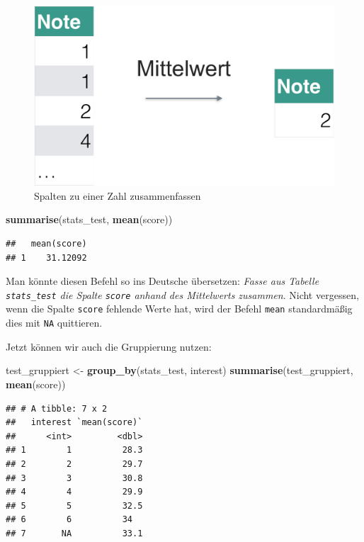 \documentclass[12pt,ngerman,paper=a4,pagesize,DIV=13]{scrreprt}
\newenvironment{Shaded}{\begin{snugshade}}{\end{snugshade}}
\newcommand{\KeywordTok}[1]{\textcolor[rgb]{0.13,0.29,0.53}{\textbf{#1}}}
\newcommand{\NormalTok}[1]{#1}
\newcommand{\StringTok}[1]{\textcolor[rgb]{0.31,0.60,0.02}{#1}}
\begin{document}
\begin{figure}

{\centering \includegraphics[width=0.6\linewidth]{Inhalte/images/Datenjudo/summarise} 

}

\caption{Spalten zu einer Zahl zusammenfassen}\label{fig:fig-summarise}
\end{figure}

\begin{Shaded}
\begin{Highlighting}[]
\KeywordTok{summarise}\NormalTok{(stats_test, }\KeywordTok{mean}\NormalTok{(score))}
\end{Highlighting}
\end{Shaded}

\begin{verbatim}
##   mean(score)
## 1    31.12092
\end{verbatim}

Man könnte diesen Befehl so ins Deutsche übersetzen: \emph{Fasse aus
Tabelle \texttt{stats\_test} die Spalte \texttt{score} anhand des
Mittelwerts zusammen}. Nicht vergessen, wenn die Spalte \texttt{score}
fehlende Werte hat, wird der Befehl \texttt{mean} standardmäßig dies mit
\texttt{NA} quittieren.

Jetzt können wir auch die Gruppierung nutzen:

\begin{Shaded}
\begin{Highlighting}[]
\NormalTok{test_gruppiert <-}\StringTok{ }\KeywordTok{group_by}\NormalTok{(stats_test, interest)}
\KeywordTok{summarise}\NormalTok{(test_gruppiert, }\KeywordTok{mean}\NormalTok{(score))}
\end{Highlighting}
\end{Shaded}

\begin{verbatim}
## # A tibble: 7 x 2
##   interest `mean(score)`
##      <int>         <dbl>
## 1        1          28.3
## 2        2          29.7
## 3        3          30.8
## 4        4          29.9
## 5        5          32.5
## 6        6          34  
## 7       NA          33.1
\end{verbatim}
\end{document}
